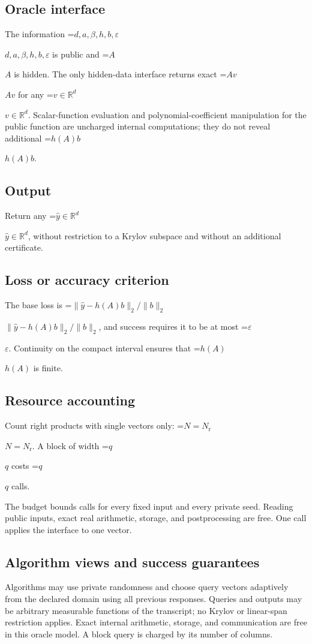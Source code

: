 \documentclass[10pt,a4paper]{article}
\newcommand{\AtlasMath}[1]{\par\begingroup\centering\setbox0=\hbox{$\displaystyle #1$}\ifdim\wd0>1.4\linewidth\typeout{ATLAS WIDE FORMULA: \the\wd0}\fi\ifdim\wd0>\linewidth\resizebox{\linewidth}{!}{\box0}\else\box0\fi\par\endgroup}
\newcommand{\AtlasInlineMath}[1]{\begingroup\setbox0=\hbox{$#1$}\ifdim\wd0>.4\linewidth\endgroup\AtlasMath{#1}\else\endgroup$#1$\fi}
\begin{document}
\subsection{Oracle interface}
The information \AtlasInlineMath{d,a,\beta,h,b,\varepsilon} is public and \AtlasInlineMath{A} is hidden. The only hidden-data interface returns exact \AtlasInlineMath{Av} for any \AtlasInlineMath{v\in\mathbb{R}^d}. Scalar-function evaluation and polynomial-coefficient manipulation for the public function are uncharged internal computations; they do not reveal additional \AtlasInlineMath{h(A)b}.

\subsection{Output}
Return any \AtlasInlineMath{\widehat{y}\in\mathbb{R}^d}, without restriction to a Krylov subspace and without an additional certificate.

\subsection{Loss or accuracy criterion}
The base loss is \AtlasInlineMath{\|\widehat{y}-h(A)b\|_2/\|b\|_2}, and success requires it to be at most \AtlasInlineMath{\varepsilon}. Continuity on the compact interval ensures that \AtlasInlineMath{h(A)} is finite.

\subsection{Resource accounting}
Count right products with single vectors only: \AtlasInlineMath{N=N_{\mathrm r}}. A block of width \AtlasInlineMath{q} costs \AtlasInlineMath{q} calls.

The budget bounds calls for every fixed input and every private seed. Reading public inputs, exact real arithmetic, storage, and postprocessing are free. One call applies the interface to one vector.

\subsection{Algorithm views and success guarantees}
Algorithms may use private randomness and choose query vectors adaptively from the declared domain using all previous responses. Queries and outputs may be arbitrary measurable functions of the transcript; no Krylov or linear-span restriction applies. Exact internal arithmetic, storage, and communication are free in this oracle model. A block query is charged by its number of columns.
\end{document}
